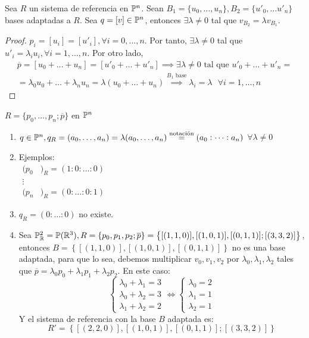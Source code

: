 \begin{prop}
    Sea $R$ un sistema de referencia en $\mathbb{P}^n$. Sean $B_1 = \{ u_0, \dots, u_n\}, B_2 = \{ u'_0, \dots u'_n \}$ bases adaptadas a $R$. Sea $q = [v] \in \mathbb{P}^n$,
    entonces $\exists \lambda \neq 0$ tal que $v_{B_2} = \lambda v_{B_1}$.
\end{prop}
\begin{proof}
    $p_i = [u_i] = [u'_i], \forall i = 0, \dots, n$. Por tanto, $\exists \lambda \neq 0$ tal que $u'_i= \lambda_i u_i, \forall i = 1, \dots, n$. Por otro lado,
    \begin{gather*}
        \overline{p} = [u_0 + \dots + u_n] = [u'_0 + \dots + u'_n] \implies \exists \lambda \neq 0 \text{ tal que } u'_0 + \dots + u'_n = \\ = \lambda_0 u_0 + \dots + \lambda_n u_n = \lambda (u_0 + \dots + u_n)
        \stackrel{B_1 \text{ base}}{\implies} \lambda_i = \lambda \text{ } \forall i = 1, \dots, n
    \end{gather*}
\end{proof}
\begin{obs}
    $R = \{ p_0, \dots, p_n; \overline{p} \}$ en $\mathbb{P}^n$
    \begin{enumerate}
        \item $q \in \mathbb{P}^n, q_R = (a_0, \dots, a_n) = \lambda (a_0, \dots, a_n) \stackrel{\text{notación}}{=} (a_0 : \dots : a_n)$ $\forall \lambda \neq 0$
        \item Ejemplos: \\ $\begin{aligned} (p_0&)_R = (1:0:\dots:0) \\ \vdots& \\ (p_n&)_R = (0:\dots:0:1) \end{aligned}$
        \item $q_R = (0: \dots : 0)$ no existe.
        \item Sea $\mathbb{P}^2_{\mathbb{R}} = \mathbb{P}(\mathbb{R}^3), R = \{ p_0, p_1, p_2; \overline{p} \} = \left\{ [(1,1,0)], [(1,0,1)], [(0,1,1)]; [(3,3,2)]\right\}$, entonces $B = \left\{ [(1,1,0)], [(1,0,1)], [(0,1,1)] \right\}$ no es una base
            adaptada, para que lo sea, debemos multiplicar $v_0, v_1, v_2$ por $\lambda_0, \lambda_1, \lambda_2$ tales que $\overline{p} = \lambda_0 p_0 + \lambda_1 p_1 + \lambda_2 p_2$. En este caso:
            \[
                \begin{cases} \lambda_0 + \lambda_1 = 3 \\ \lambda_0 + \lambda_2 = 3 \\ \lambda_1 + \lambda_2 = 2 \end{cases} \iff \begin{cases} \lambda_0 = 2 \\ \lambda_1 = 1 \\ \lambda_2 = 1 \end{cases}
            \]
            Y el sistema de referencia con la base $B$ adaptada es: \[ R' = \left\{ [(2,2,0)], [(1,0,1)], [(0,1,1)]; [(3,3,2)]\right\} \]
    \end{enumerate}
\end{obs}

